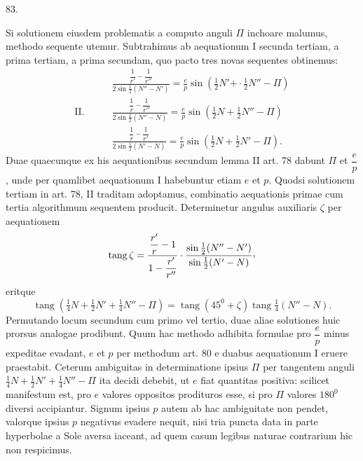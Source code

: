 \par{}\medskip
\hypertarget{native-112-article083}{}
\begin{center}83.\end{center}
Si solutionem eiusdem problematis a computo anguli $\Pi$ inchoare malumus, methodo sequente utemur. Subtrahimus ab aequationum I secunda tertiam, a prima tertiam, a prima secundam, quo pacto tres novas sequentes obtinemus:
\[
\begin{aligned}
&\frac{\dfrac1{r'}-\dfrac1{r''}}{2\sin\tfrac12(N''-N')}=\frac{e}{p}\sin(\tfrac12N'+\mathpunct{\cdot}\tfrac12N''-\Pi)\\[6pt]
\mathrm{II.}\qquad&\frac{\dfrac1r-\dfrac1{r''}}{2\sin\tfrac12(N''-N)}=\frac{e}{p}\sin(\tfrac12N+\tfrac12N''-\Pi)\\[6pt]
&\frac{\dfrac1r-\dfrac1{r'}}{2\sin\tfrac12(N'-N)}=\frac{e}{p}\sin(\tfrac12N+\tfrac12N'-\Pi).
\end{aligned}
\]
Duae quaecunque ex his aequationibus secundum lemma II art. 78 dabunt $\Pi$ et $\dfrac{e}{p}$, unde per quamlibet aequationum I habebuntur etiam $e$ et $p$. Quodsi solutionem tertiam in art. 78, II traditam adoptamus, combinatio aequationis primae cum tertia algorithmum sequentem producit. Determinetur angulus auxiliaris $\zeta$ per aequationem
\[
\operatorname{tang}\zeta=\frac{\dfrac{r'}r-1}{1-\dfrac{r'}{r''}}\cdot\frac{\sin\tfrac12(N''-N')}{\sin\tfrac12(N'-N)}\mathpunct{\raisebox{.45ex}{,}}
\]
eritque
\[
\operatorname{tang}(\tfrac14N+\tfrac12N'+\tfrac14N''-\Pi)=\operatorname{tang}(45^0+\zeta)\operatorname{tang}\tfrac14(N''-N).
\]
Permutando locum secundum cum primo vel tertio, duae aliae solutiones huic prorsus analogae prodibunt. Quum hac methodo adhibita formulae pro $\dfrac{e}{p}$ minus expeditae evadant, $e$ et $p$ per methodum art. 80 e duabus aequationum I eruere praestabit. Ceterum ambiguitas in determinatione ipsius $\Pi$ per tangentem anguli $\tfrac14N+\tfrac12N'+\tfrac14N''-\Pi$ ita decidi debebit, ut $e$ fiat quantitas positiva: scilicet manifestum est, pro $e$ valores oppositos prodituros esse, si pro $\Pi$ valores $180^0$ diversi accipiantur. Signum ipsius $p$ autem ab hac ambiguitate non pendet, valorque ipsius $p$ negativus evadere nequit, nisi tria puncta data in parte hyperbolae a Sole aversa iaceant, ad quem casum legibus naturae contrarium hic non respicimus.

